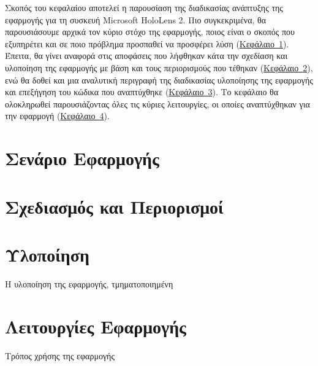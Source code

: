 
Σκοπός του κεφαλαίου αποτελεί η παρουσίαση της διαδικασίας ανάπτυξης της εφαρμογής για τη συσκευή Microsoft HoloLens 2. Πιο συγκεκριμένα, θα παρουσιάσουμε αρχικά τον κύριο στόχο της εφαρμογής, ποιος είναι ο σκοπός που εξυπηρέτει και σε ποιο πρόβλημα προσπαθεί να προσφέρει λύση (\hyperref[sec:appScenario]{Κεφάλαιο~\ref*{sec:appScenario}}). Έπειτα, θα γίνει αναφορά στις αποφάσεις που λήφθηκαν κάτα την σχεδίαση και υλοποίηση της εφαρμογής με βάση και τους περιορισμούς που τέθηκαν (\hyperref[sec:appDesignAndLimitations]{Κεφάλαιο~\ref*{sec:appDesignAndLimitations}}), ενώ θα δοθεί και μια αναλυτική περιγραφή της διαδικασίας υλοποίησης της εφαρμογής και επεξήγηση του κώδικα που αναπτύχθηκε (\hyperref[sec:appImplementation]{Κεφάλαιο~\ref*{sec:appImplementation}}). Το κεφάλαιο θα ολοκληρωθεί παρουσιάζοντας όλες τις κύριες λειτουργίες, οι οποίες αναπτύχθηκαν για την εφαρμογή (\hyperref[sec:appFunctionalities]{Κεφάλαιο~\ref*{sec:appFunctionalities}}).

\section{Σενάριο Εφαρμογής}\label{sec:appScenario}


\section{Σχεδιασμός και Περιορισμοί}\label{sec:appDesignAndLimitations}


\section{Υλοποίηση}\label{sec:appImplementation}
Η υλοποίηση της εφαρμογής, τμηματοποιημένη

\section{Λειτουργίες Εφαρμογής}\label{sec:appFunctionalities}
Τρόπος χρήσης της εφαρμογής

